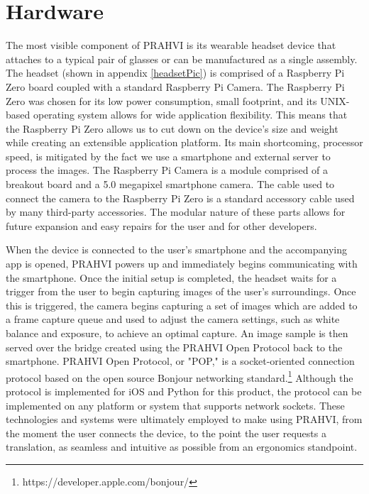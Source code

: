 \section{Hardware}
The most visible component of PRAHVI is its wearable headset device that attaches to a typical pair of glasses or can be manufactured as a single assembly. The headset (shown in appendix \ref{headsetPic}) is comprised of a Raspberry Pi Zero board coupled with a standard Raspberry Pi Camera. The Raspberry Pi Zero was chosen for its low power consumption, small footprint, and its UNIX-based operating system allows for wide application flexibility. This means that the Raspberry Pi Zero allows us to cut down on the device's size and weight while creating an extensible application platform. Its main shortcoming, processor speed, is mitigated by the fact we use a smartphone and external server to process the images. The Raspberry Pi Camera is a module comprised of a breakout board and a 5.0 megapixel smartphone camera. The cable used to connect the camera to the Raspberry Pi Zero is a standard accessory cable used by many third-party accessories. The modular nature of these parts allows for future expansion and easy repairs for the user and for other developers. 

When the device is connected to the user's smartphone and the accompanying app is opened, PRAHVI powers up and immediately begins communicating with the smartphone. Once the initial setup is completed, the headset waits for a trigger from the user to begin capturing images of the user's surroundings. Once this is triggered, the camera begins capturing a set of images which are added to a frame capture queue and used to adjust the camera settings, such as white balance and exposure, to achieve an optimal capture. An image sample is then served over the bridge created using the PRAHVI Open Protocol back to the smartphone. PRAHVI Open Protocol, or "POP," is a socket-oriented connection protocol based on the open source Bonjour networking standard.\footnote{https://developer.apple.com/bonjour/} Although the protocol is implemented for iOS and Python for this product, the protocol can be implemented on any platform or system that supports network sockets. These technologies and systems were ultimately employed to make using PRAHVI, from the moment the user connects the device, to the point the user requests a translation, as seamless and intuitive as possible from an ergonomics standpoint.

